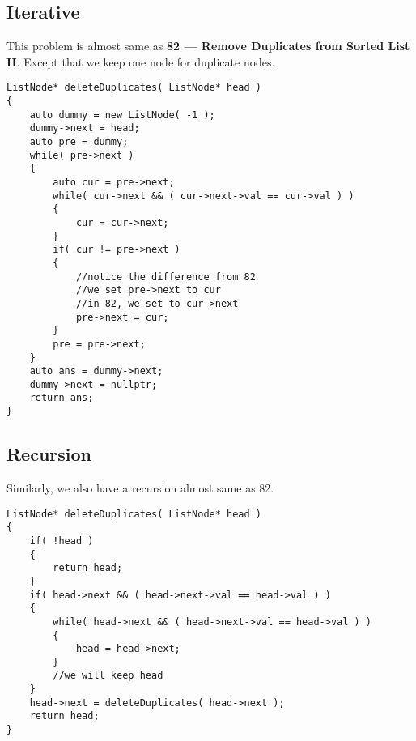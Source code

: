 \subsection{Iterative}

This problem is almost same as \textbf{82 --- Remove Duplicates from Sorted List II}. Except that we keep one node for duplicate nodes.

\begin{lstlisting}[style=customc, caption={Iterative}]
ListNode* deleteDuplicates( ListNode* head )
{
    auto dummy = new ListNode( -1 );
    dummy->next = head;
    auto pre = dummy;
    while( pre->next )
    {
        auto cur = pre->next;
        while( cur->next && ( cur->next->val == cur->val ) )
        {
            cur = cur->next;
        }
        if( cur != pre->next )
        {
            //notice the difference from 82
            //we set pre->next to cur
            //in 82, we set to cur->next
            pre->next = cur;
        }
        pre = pre->next;
    }
    auto ans = dummy->next;
    dummy->next = nullptr;
    return ans;
}
\end{lstlisting}

\subsection{Recursion}
Similarly, we also have a recursion almost same as 82.

\begin{lstlisting}[style=customc, caption={Recursion}]
ListNode* deleteDuplicates( ListNode* head )
{
    if( !head )
    {
        return head;
    }
    if( head->next && ( head->next->val == head->val ) )
    {
        while( head->next && ( head->next->val == head->val ) )
        {
            head = head->next;
        }
        //we will keep head
    }
    head->next = deleteDuplicates( head->next );
    return head;
}
\end{lstlisting}